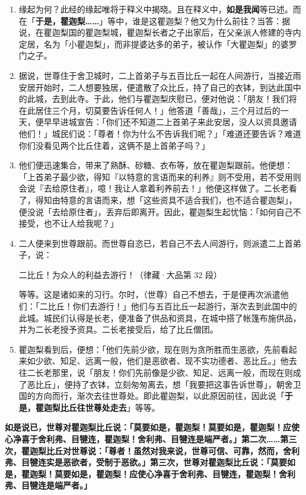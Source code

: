 \begin{enumerate}\item 缘起为何？此经的缘起唯将于释义中揭晓。且在释义中，\textbf{如是我闻}等已述。而在「\textbf{于是，瞿迦梨……}」等中，谁是这瞿迦梨？他又为什么前往？当答：据说，在瞿迦梨国的瞿迦梨城，瞿迦梨长者之子出家后，在父亲派人修建的寺内定居，名为「小瞿迦梨」，而非提婆达多的弟子，被认作「大瞿迦梨」的婆罗门之子。
\item 据说，世尊住于舍卫城时，二上首弟子与五百比丘一起在人间游行，当接近雨安居开始时，二人想要独居，便遣散了众比丘，持了自己的衣钵，到达此国中的此城，去到此寺。于此，他们与瞿迦梨庆慰已，便对他说：「朋友！我们将在此居住三个月，切莫要告诉任何人！」他答道「善哉」，三个月过后的一天，便早早进城宣告：「你们还不知道二上首弟子来此安居，没人以资具邀请他们！」城民们说：「尊者！你为什么不告诉我们呢？」「难道还要告诉？难道你们没看见两个比丘住着，这俩不是上首弟子吗？」
\item 他们便迅速集合，带来了熟酥、砂糖、衣布等，放在瞿迦梨跟前。他便想：「上首弟子最少欲，得知『以特意的言语而来的利养』则不受用，若不受用则会说『去给原住者』，噫！我让人拿着利养前去！」他便这样做了。二长老看了，得知由特意的言语而来，想「这些资具不适合我们，也不适合瞿迦梨」，便没说「去给原住者」，丢弃后即离开。因此，瞿迦梨生起忧恼：「如何自己不接受，也不让人给我呢？」
\item 二人便来到世尊跟前。而世尊自恣已，若自己不去人间游行，则派遣二上首弟子，说：\begin{quoting}二比丘！为众人的利益去游行！（律藏·大品第 32 段）\end{quoting}等等。这是诸如来的习行。尔时，（世尊）自己不想去，于是便再次派遣他们：「二比丘！你们去游行！」他们与五百比丘一起游行，渐次去到此国中的此城。城民们认得是长老，便准备了供品和资具，在城中搭了帐篷布施供品，并为二长老授予资具。二长老接受后，给了比丘僧团。
\item 瞿迦梨看到后，便想：「他们先前少欲，现在则为贪所胜而生恶欲，先前看起来如少欲、知足、远离一般，他们是恶欲者、现不实功德者、恶比丘。」他去往二长老那里，说「朋友！你们先前像是少欲、知足、远离一般，而现在则成了恶比丘」，便持了衣钵，立刻匆匆离去，想「我要把这事告诉世尊」，朝舍卫国的方向而行，渐次去往世尊处。即此瞿迦梨，以此原因前往，因此说「\textbf{于是，瞿迦梨比丘往世尊处走去}」等等。\end{enumerate}

\textbf{如是说已，世尊对瞿迦梨比丘说：「莫要如是，瞿迦梨！莫要如是，瞿迦梨！应使心净喜于舍利弗、目犍连，瞿迦梨！舍利弗、目犍连是端严者。」第二次……第三次，瞿迦梨比丘对世尊说：「尊者！虽然对我来说，世尊可信、可靠，然而，舍利弗、目犍连实是恶欲者，受制于恶欲。」第三次，世尊对瞿迦梨比丘说：「莫要如是，瞿迦梨！莫要如是，瞿迦梨！应使心净喜于舍利弗、目犍连，瞿迦梨！舍利弗、目犍连是端严者。」}

